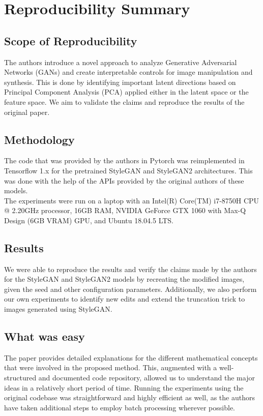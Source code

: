 \section*{Reproducibility Summary}

\subsection*{Scope of Reproducibility}

The authors introduce a novel approach to analyze Generative Adversarial Networks (GANs) and create interpretable controls for image manipulation and synthesis. This is done by identifying important latent directions based on Principal Component Analysis (PCA) applied either in the latent space or the feature space. We aim to validate the claims and reproduce the results of the original paper.

\subsection*{Methodology}

The code that was provided by the authors in Pytorch was reimplemented in Tensorflow 1.x for the pretrained StyleGAN and StyleGAN2 architectures. This was done with the help of the APIs provided by the original authors of these models.
\\
The experiments were run on a laptop with an Intel(R) Core(TM) i7-8750H CPU @ 2.20GHz processor, 16GB RAM, NVIDIA GeForce GTX 1060 with Max-Q Design (6GB VRAM) GPU, and Ubuntu 18.04.5 LTS.

\subsection*{Results}

We were able to reproduce the results and verify the claims made by the authors for the StyleGAN and StyleGAN2 models by recreating the modified images, given the seed and other configuration parameters.
Additionally, we also perform our own experiments to identify new edits and extend the truncation trick to images generated using StyleGAN.

\subsection*{What was easy}

The paper provides detailed explanations for the different mathematical concepts that were involved in the proposed method. This, augmented with a well-structured and documented code repository, allowed us to understand the major ideas in a relatively short period of time. Running the experiments using the original codebase was straightforward and highly efficient as well, as the authors have taken additional steps to employ batch processing wherever possible.

